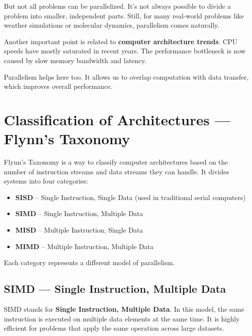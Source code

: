 \documentclass[12pt]{book}
\begin{document}
\vspace{0.3cm}

But not all problems can be parallelized. It’s not always possible to divide a problem into smaller, independent parts. Still, for many real-world problems like weather simulations or molecular dynamics, parallelism comes naturally.

\vspace{0.3cm}

Another important point is related to \textbf{computer architecture trends}. CPU speeds have mostly saturated in recent years. The performance bottleneck is now caused by slow memory bandwidth and latency.

Parallelism helps here too. It allows us to overlap computation with data transfer, which improves overall performance.





\section{Classification of Architectures — Flynn's Taxonomy}
\label{sec:flynn-taxonomy}

Flynn's Taxonomy is a way to classify computer architectures based on the number of instruction streams and data streams they can handle. It divides systems into four categories:

\begin{itemize}
    \item \textbf{SISD} – Single Instruction, Single Data (used in traditional serial computers)
    \item \textbf{SIMD} – Single Instruction, Multiple Data
    \item \textbf{MISD} – Multiple Instruction, Single Data
    \item \textbf{MIMD} – Multiple Instruction, Multiple Data
\end{itemize}

Each category represents a different model of parallelism.

\subsection{SIMD — Single Instruction, Multiple Data}
\label{subsec:simd}

SIMD stands for \textbf{Single Instruction, Multiple Data}. In this model, the same instruction is executed on multiple data elements at the same time. It is highly efficient for problems that apply the same operation across large datasets.
\end{document}
